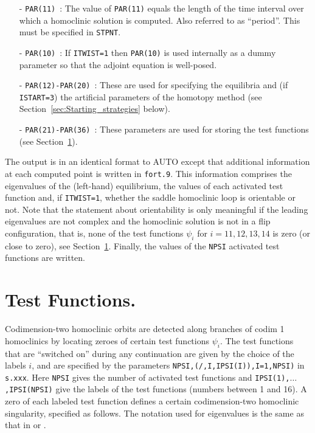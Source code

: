 \documentclass[12pt]{report}
\begin{document}
\begin{itemize}

\item[-] {\tt PAR(11)}~: 
The value of {\tt PAR(11)} equals the length of the time interval over
which a homoclinic solution is computed. Also referred to as ``period''.
This must be specified in {\tt STPNT}.

\item[-] {\tt PAR(10)}~: 
If {\tt ITWIST=1} then {\tt PAR(10)} is used internally as a
dummy parameter so that the adjoint equation is well-posed.

\item[-] {\tt PAR(12)-PAR(20)}~:
These are used for specifying the 
equilibria and (if {\tt ISTART=3}) the artificial parameters of
the homotopy method (see Section~\ref{sec:Starting_strategies} below).

\item[-] {\tt PAR(21)-PAR(36)}~: 
These parameters are used for storing the test functions 
(see Section~\ref{sec:HomCont_Test_functions}).
\end{itemize}

The output is in an identical format to {\cal AUTO} except that
additional information at each computed point is written 
in {\tt fort.9}. This information comprises the eigenvalues of
the (left-hand) equilibrium, the values of each activated test
function and, if {\tt ITWIST=1}, 
whether the saddle homoclinic loop is orientable
or not.
Note that the statement about orientability is only meaningful if the
leading eigenvalues are not complex and the homoclinic solution is not
in a flip configuration, that is, none of the test functions 
$\psi_i$ for $i=11,12,13,14$ is zero (or close to zero), 
see Section~\ref{sec:HomCont_Test_functions}.
 Finally, the values of the {\tt NPSI} activated test functions are written. 

\section{ Test Functions.} \label{sec:HomCont_Test_functions}
Codimension-two homoclinic orbits are detected along branches of codim
1 homoclinics by locating zeroes of certain test functions
$\psi_i$. The test functions that are ``switched on'' during any
continuation are given by the choice of the labels $i$, and are
specified by the parameters {\tt NPSI,(/,I,IPSI(I)),I=1,NPSI)} in {\tt
s.xxx}.  Here {\tt NPSI} gives the number of activated test functions
and {\tt IPSI(1),$\ldots$,IPSI(NPSI)} give the labels of
the test functions (numbers between 1 and 16). A zero of
each labeled test function defines a certain codimension-two 
homoclinic singularity, specified as follows.
The notation used for eigenvalues is the same as that in
 or . 
\end{document}
